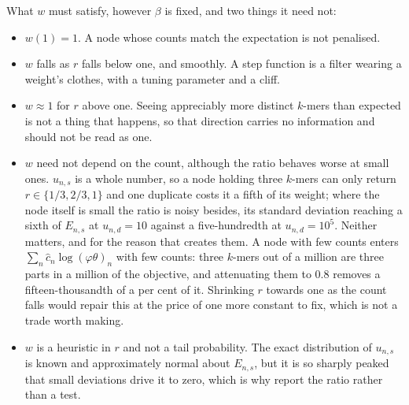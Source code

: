 \documentclass[pdflatex,sn-vancouver-num]{sn-jnl}
\begin{document}
    What $w$ must satisfy, however $\beta$ is fixed, and two things it need not:
    \begin{itemize}
        \item $w(1) = 1$. A node whose counts match the expectation is not penalised.
        \item $w$ falls as $r$ falls below one, and smoothly. A step function is a filter wearing a
              weight's clothes, with a tuning parameter and a cliff.
        \item $w \approx 1$ for $r$ above one. Seeing appreciably more distinct $k$-mers than expected
              is not a thing that happens, so that direction carries no information and should not be
              read as one.
        \item $w$ need not depend on the count, although the ratio behaves worse at small ones.
              $u_{n,s}$ is a whole number, so a node holding three $k$-mers can only return
              $r \in \{1/3, 2/3, 1\}$ and one duplicate costs it a fifth of its weight; where the
              node itself is small the ratio is noisy besides, its standard deviation reaching a
              sixth of $E_{n,s}$ at $u_{n,d} = 10$ against a five-hundredth at $u_{n,d} = 10^5$.
              Neither matters, and for the reason that creates them. A node with few counts enters
              $\sum_n \hat{c}_n \log (\varphi\theta)_n$ with few counts: three $k$-mers out of a
              million are three parts in a million of the objective, and attenuating them to $0.8$
              removes a fifteen-thousandth of a per cent of it. Shrinking $r$ towards one as the
              count falls would repair this at the price of one more constant to fix, which is not
              a trade worth making.
        \item $w$ is a heuristic in $r$ and not a tail probability. The exact distribution of
              $u_{n,s}$ is known and approximately normal about $E_{n,s}$, but it is so sharply peaked
              that small deviations drive it to zero, which is why \citet{genestrip-pub} report the
              ratio rather than a test.
    \end{itemize}
\end{document}
